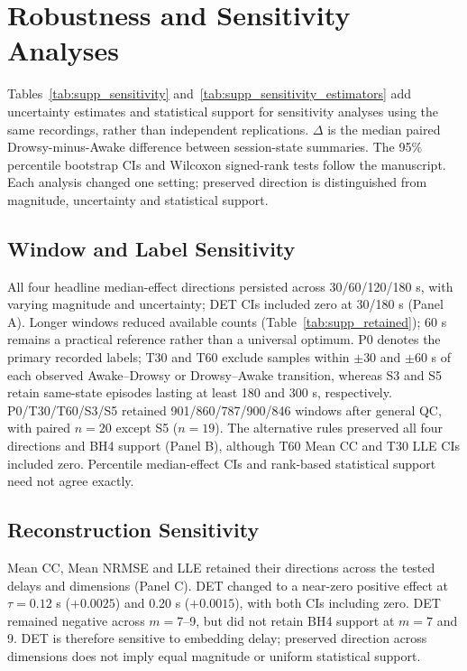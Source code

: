 \documentclass[conference,a4paper]{IEEEtran}
\begin{document}

\section{Robustness and Sensitivity Analyses}
\label{sec:supp_6}

Tables~\ref{tab:supp_sensitivity} and~\ref{tab:supp_sensitivity_estimators} add uncertainty estimates and statistical support for sensitivity analyses using the same recordings, rather than independent replications. $\Delta$ is the median paired Drowsy-minus-Awake difference between session-state summaries. The 95\% percentile bootstrap CIs and Wilcoxon signed-rank tests follow the manuscript. Each analysis changed one setting; preserved direction is distinguished from magnitude, uncertainty and statistical support.

\subsection{Window and Label Sensitivity}
\label{sec:supp_6_1}

All four headline median-effect directions persisted across 30/60/120/180 s, with varying magnitude and uncertainty; DET CIs included zero at 30/180 s (Panel A). Longer windows reduced available counts (Table~\ref{tab:supp_retained}); 60 s remains a practical reference rather than a universal optimum. P0 denotes the primary recorded labels; T30 and T60 exclude samples within $\pm30$ and $\pm60$ s of each observed Awake--Drowsy or Drowsy--Awake transition, whereas S3 and S5 retain same-state episodes lasting at least 180 and 300 s, respectively. P0/T30/T60/S3/S5 retained 901/860/787/900/846 windows after general QC, with paired $n=20$ except S5 ($n=19$). The alternative rules preserved all four directions and BH4 support (Panel B), although T60 Mean CC and T30 LLE CIs included zero. Percentile median-effect CIs and rank-based statistical support need not agree exactly.

\subsection{Reconstruction Sensitivity}
\label{sec:supp_6_2}

Mean CC, Mean NRMSE and LLE retained their directions across the tested delays and dimensions (Panel C). DET changed to a near-zero positive effect at $\tau=0.12$ s ($+0.0025$) and 0.20 s ($+0.0015$), with both CIs including zero. DET remained negative across $m=7$--9, but did not retain BH4 support at $m=7$ and 9. DET is therefore sensitive to embedding delay; preserved direction across dimensions does not imply equal magnitude or uniform statistical support.
\end{document}
